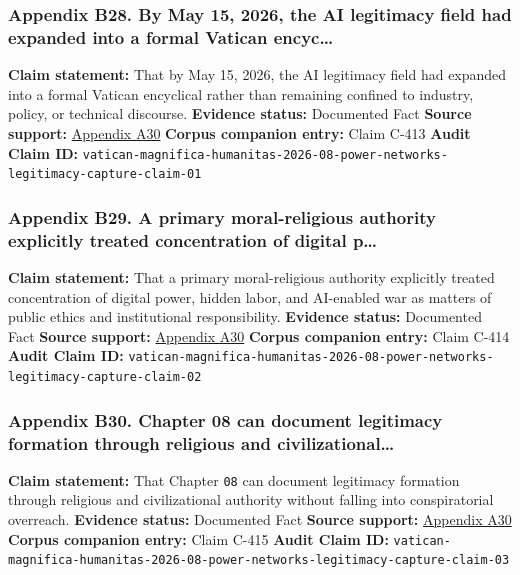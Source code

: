 \documentclass[
  american,
  11pt,
  letterpaper,
]{article}
\begin{document}
\subsubsection{Appendix B28. By May 15, 2026, the AI legitimacy field
had expanded into a formal Vatican
encyc\ldots{}}\label{ch-10-appendix-b28-by-may-15-2026-the-ai-legitimacy-field-had-expanded-into-a-formal-vatican-encyc}

\textbf{Claim statement:} That by May 15, 2026, the AI legitimacy field
had expanded into a formal Vatican encyclical rather than remaining
confined to industry, policy, or technical discourse. \textbf{Evidence
status:} Documented Fact \textbf{Source support:}
\hyperref[ch-10-appendix-a30-encyclical-letter-of-his-holiness-leo-xiv-magnifica-humanitas]{Appendix
A30} \textbf{Corpus companion entry:} Claim C-413 \textbf{Audit Claim
ID:}
\texttt{vatican-magnifica-humanitas-2026-08-power-networks-legitimacy-capture-claim-01}

\subsubsection{Appendix B29. A primary moral-religious authority
explicitly treated concentration of digital
p\ldots{}}\label{ch-10-appendix-b29-a-primary-moral-religious-authority-explicitly-treated-concentration-of-digital-p}

\textbf{Claim statement:} That a primary moral-religious authority
explicitly treated concentration of digital power, hidden labor, and
AI-enabled war as matters of public ethics and institutional
responsibility. \textbf{Evidence status:} Documented Fact \textbf{Source
support:}
\hyperref[ch-10-appendix-a30-encyclical-letter-of-his-holiness-leo-xiv-magnifica-humanitas]{Appendix
A30} \textbf{Corpus companion entry:} Claim C-414 \textbf{Audit Claim
ID:}
\texttt{vatican-magnifica-humanitas-2026-08-power-networks-legitimacy-capture-claim-02}

\subsubsection{Appendix B30. Chapter 08 can document legitimacy
formation through religious and
civilizational\ldots{}}\label{ch-10-appendix-b30-chapter-08-can-document-legitimacy-formation-through-religious-and-civilizational}

\textbf{Claim statement:} That Chapter \texttt{08} can document
legitimacy formation through religious and civilizational authority
without falling into conspiratorial overreach. \textbf{Evidence status:}
Documented Fact \textbf{Source support:}
\hyperref[ch-10-appendix-a30-encyclical-letter-of-his-holiness-leo-xiv-magnifica-humanitas]{Appendix
A30} \textbf{Corpus companion entry:} Claim C-415 \textbf{Audit Claim
ID:}
\texttt{vatican-magnifica-humanitas-2026-08-power-networks-legitimacy-capture-claim-03}
\end{document}
